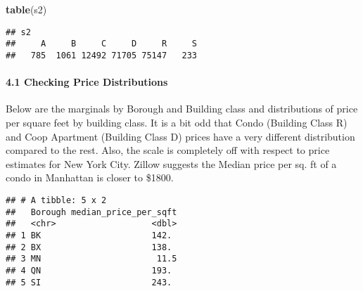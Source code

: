 \documentclass[]{article}
\newenvironment{Shaded}{\begin{snugshade}}{\end{snugshade}}
\newcommand{\CommentTok}[1]{\textcolor[rgb]{0.56,0.35,0.01}{\textit{#1}}}
\newcommand{\DataTypeTok}[1]{\textcolor[rgb]{0.13,0.29,0.53}{#1}}
\newcommand{\KeywordTok}[1]{\textcolor[rgb]{0.13,0.29,0.53}{\textbf{#1}}}
\newcommand{\NormalTok}[1]{#1}
\newcommand{\OperatorTok}[1]{\textcolor[rgb]{0.81,0.36,0.00}{\textbf{#1}}}
\newcommand{\StringTok}[1]{\textcolor[rgb]{0.31,0.60,0.02}{#1}}
\let\oldparagraph\paragraph
\renewcommand{\paragraph}[1]{\oldparagraph{#1}\mbox{}}
\begin{document}
\begin{Shaded}
\begin{Highlighting}[]
\KeywordTok{table}\NormalTok{(s2)}
\end{Highlighting}
\end{Shaded}

\begin{verbatim}
## s2
##     A     B     C     D     R     S 
##   785  1061 12492 71705 75147   233
\end{verbatim}

\begin{Shaded}
\end{Shaded}

\hypertarget{checking-price-distributions}{%
\paragraph{4.1 Checking Price
Distributions}\label{checking-price-distributions}}

Below are the marginals by Borough and Building class and distributions
of price per square feet by building class. It is a bit odd that Condo
(Building Class R) and Coop Apartment (Building Class D) prices have a
very different distribution compared to the rest. Also, the scale is
completely off with respect to price estimates for New York City. Zillow
suggests the Median price per sq. ft of a condo in Manhattan is closer
to \$1800.

\begin{Shaded}
\end{Shaded}

\begin{verbatim}
## # A tibble: 5 x 2
##   Borough median_price_per_sqft
##   <chr>                   <dbl>
## 1 BK                      142. 
## 2 BX                      138. 
## 3 MN                       11.5
## 4 QN                      193. 
## 5 SI                      243.
\end{verbatim}
\end{document}
